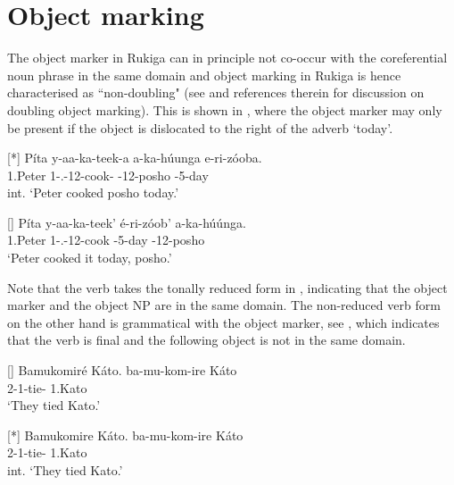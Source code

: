 \documentclass[output=paper]{langscibook}
\begin{document}
\pagebreak
\section{Object marking}\label{sec:objmarking}

The object marker in Rukiga can in principle not co-occur with the coreferential noun phrase in the same domain and object marking in Rukiga is hence characterised as ``non-doubling" (see \citealt{vanderWal2022} and references therein for discussion on doubling object marking). This is shown in , where the object marker may only be present if the object is dislocated to the right of the adverb ‘today’. 

\ea
\label{bkm:Ref111488765}
\ea
[*]{
\label{bkm:Ref111488765:a}
\gll
Píta  y-aa-ka-teek-a  a-ka-húunga  e-ri-zóoba.\\
1.Peter  1\SM{}-\N{}.\PST{}-12\OM{}-cook-\FV{}  \AUG{}-12-posho  \AUG{}-5-day \\
\glt
int. ‘Peter cooked posho today.’\\
}


\ex
[]{
\label{bkm:Ref111488765:b}
\gll
Píta  y-aa-ka-teek’  é-ri-zóob’  a-ka-húúnga.\\
1.Peter  1\SM{}-\N{}.\PST{}-12\OM{}-cook  \AUG{}-5-day  \AUG{}-12-posho\\
\glt
‘Peter cooked it today, posho.’\\
}


\z
\z


Note that the verb takes the tonally reduced form in , indicating that the object marker and the object NP are in the same domain. The non-reduced verb form on the other hand is grammatical with the object marker, see , which indicates that the verb is final and the following object is not in the same domain.

\ea
\label{bkm:Ref111488925}
\ea
[]{
\label{bkm:Ref111488925:a}
Bamukomiré Káto.    \jambox*{[no TR]}
\gll
ba-mu-kom-ire  Káto\\
2\SM{}-1\OM{}-tie-\PFV{}  1.Kato\\
\glt
‘They tied Kato.’\\
}


\ex
[*]{
\label{bkm:Ref111488925:b}
Bamukomire Káto.  \jambox*{[TR]}
\gll
ba-mu-kom-ire  Káto\\
2\SM{}-1\OM{}-tie-\PFV{}  1.Kato\\
\glt
int. ‘They tied Kato.’\\
}
\end{document}

